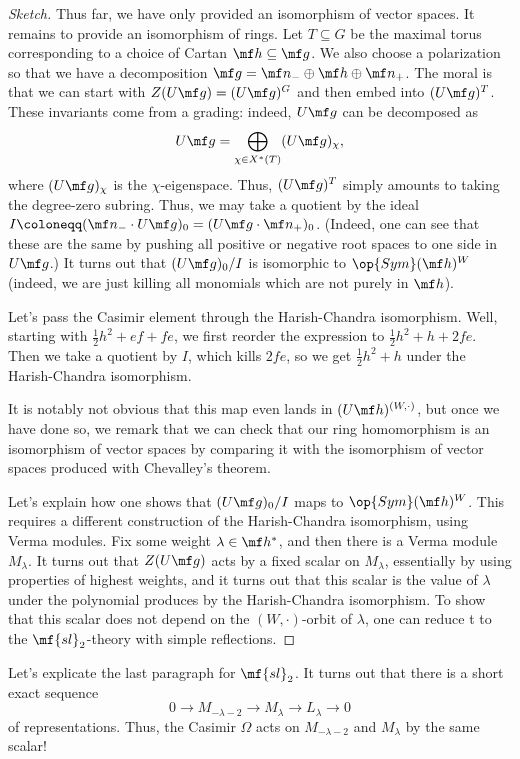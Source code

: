 \documentclass[../notes.tex]{subfiles}
\begin{document}
\begin{proof}[Sketch]
	Thus far, we have only provided an isomorphism of vector spaces. It remains to provide an isomorphism of rings. Let $T\subseteq G$ be the maximal torus corresponding to a choice of Cartan $\mf h\subseteq\mf g$. We also choose a polarization so that we have a decomposition $\mf g=\mf n_-\oplus\mf h\oplus\mf n_+$. The moral is that we can start with $Z(U\mf g)=(U\mf g)^G$ and then embed into $(U\mf g)^T$. These invariants come from a grading: indeed, $U\mf g$ can be decomposed as
	\[U\mf g=\bigoplus_{\chi\in X^*(T)}(U\mf g)_\chi,\]
	where $(U\mf g)_\chi$ is the $\chi$-eigenspace. Thus, $(U\mf g)^T$ simply amounts to taking the degree-zero subring. Thus, we may take a quotient by the ideal $I\coloneqq(\mf n_-\cdot U\mf g)_0=(U\mf g\cdot\mf n_+)_0$. (Indeed, one can see that these are the same by pushing all positive or negative root spaces to one side in $U\mf g$.) It turns out that $(U\mf g)_0/I$ is isomorphic to $\op{Sym}(\mf h)^W$ (indeed, we are just killing all monomials which are not purely in $\mf h$).
	\begin{example}
		Let's pass the Casimir element through the Harish-Chandra isomorphism. Well, starting with $\frac12h^2+ef+fe$, we first reorder the expression to $\frac12h^2+h+2fe$. Then we take a quotient by $I$, which kills $2fe$, so we get $\frac12h^2+h$ under the Harish-Chandra isomorphism.
	\end{example} 
	It is notably not obvious that this map even lands in $(U\mf h)^{(W,\cdot)}$, but once we have done so, we remark that we can check that our ring homomorphism is an isomorphism of vector spaces by comparing it with the isomorphism of vector spaces produced with Chevalley's theorem.

	Let's explain how one shows that $(U\mf g)_0/I$ maps to $\op{Sym}(\mf h)^W$. This requires a different construction of the Harish-Chandra isomorphism, using Verma modules. Fix some weight $\lambda\in\mf h^*$, and then there is a Verma module $M_\lambda$. It turns out that $Z(U\mf g)$ acts by a fixed scalar on $M_\lambda$, essentially by using properties of highest weights, and it turns out that this scalar is the value of $\lambda$ under the polynomial produces by the Harish-Chandra isomorphism. To show that this scalar does not depend on the $(W,\cdot)$-orbit of $\lambda$, one can reduce t to the $\mf{sl}_2$-theory with simple reflections.
\end{proof}
\begin{example}
	Let's explicate the last paragraph for $\mf{sl}_2$. It turns out that there is a short exact sequence
	\[0\to M_{-\lambda-2}\to M_\lambda\to L_\lambda\to0\]
	of representations. Thus, the Casimir $\Omega$ acts on $M_{-\lambda-2}$ and $M_\lambda$ by the same scalar!
\end{example}
\end{document}
